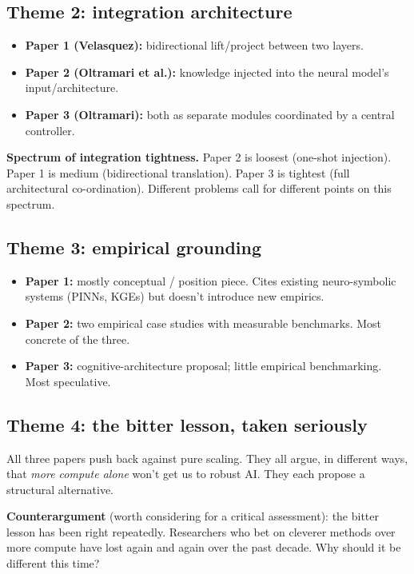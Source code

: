 \documentclass[11pt, a4paper]{article}
\begin{document}
\subsection{Theme 2: integration architecture}

\begin{itemize}
  \item \textbf{Paper 1 (Velasquez):} bidirectional lift/project between two layers.
  \item \textbf{Paper 2 (Oltramari et al.):} knowledge injected into the neural model's input/architecture.
  \item \textbf{Paper 3 (Oltramari):} both as separate modules coordinated by a central controller.
\end{itemize}

\textbf{Spectrum of integration tightness.} Paper 2 is loosest (one-shot injection). Paper 1 is medium (bidirectional translation). Paper 3 is tightest (full architectural co-ordination). Different problems call for different points on this spectrum.

\subsection{Theme 3: empirical grounding}

\begin{itemize}
  \item \textbf{Paper 1:} mostly conceptual / position piece. Cites existing neuro-symbolic systems (PINNs, KGEs) but doesn't introduce new empirics.
  \item \textbf{Paper 2:} two empirical case studies with measurable benchmarks. Most concrete of the three.
  \item \textbf{Paper 3:} cognitive-architecture proposal; little empirical benchmarking. Most speculative.
\end{itemize}

\subsection{Theme 4: the bitter lesson, taken seriously}

All three papers push back against pure scaling. They all argue, in different ways, that \emph{more compute alone} won't get us to robust AI. They each propose a structural alternative.

\textbf{Counterargument} (worth considering for a critical assessment): the bitter lesson has been right repeatedly. Researchers who bet on cleverer methods over more compute have lost again and again over the past decade. Why should it be different this time?
\end{document}

